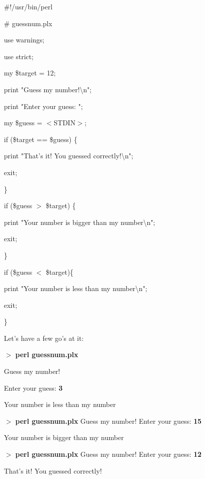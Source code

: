 \documentclass[a4paper,11pt]{book}
\begin{document}
\noindent 

\noindent 

\noindent \#!/usr/bin/perl

\noindent \# guessnum.plx

\noindent use warnings;

\noindent use strict;

\noindent 

\noindent my \$target = 12;

\noindent print "Guess my number!\textbackslash n";

\noindent print "Enter your guess: ";

\noindent my \$guess = $<$STDIN$>$;

\noindent 

\noindent if (\$target == \$guess) \{

\noindent print "That's it! You guessed correctly!\textbackslash n";

\noindent exit;

\noindent \}

\noindent if (\$guess $>$ \$target) \{

\noindent print "Your number is bigger than my number\textbackslash n";

\noindent exit;

\noindent \}

\noindent if (\$guess $<$ \$target)\{

\noindent print "Your number is less than my number\textbackslash n";

\noindent exit;

\noindent \}

\noindent 

\noindent Let's have a few go's at it:

\noindent 

\noindent 

\noindent $>$ \textbf{perl guessnum.plx}

\noindent Guess my number!

\noindent Enter your guess: \textbf{3}

\noindent Your number is less than my number

\noindent $>$ \textbf{perl guessnum.plx }Guess my number! Enter your guess: \textbf{15}

\noindent Your number is bigger than my number

\noindent $>$ \textbf{perl guessnum.plx }Guess my number! Enter your guess: \textbf{12}

\noindent That's it! You guessed correctly!
\end{document}
